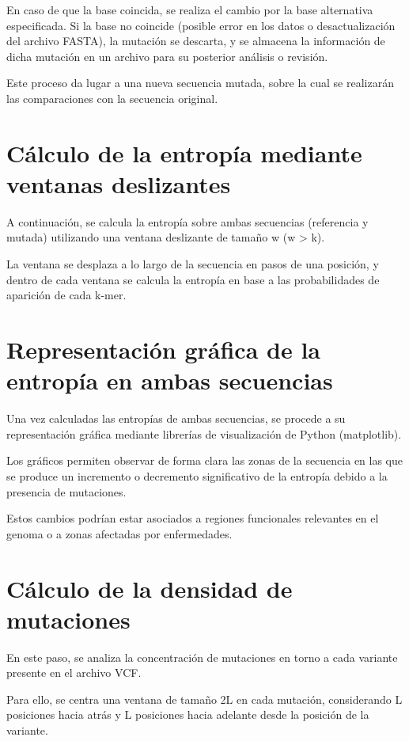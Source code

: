 \documentclass[11pt,spanish,listoffigures,listoftables]{tfgetsinf}
\begin{document}
En caso de que la base coincida, se realiza el cambio por la base alternativa especificada. Si la base no coincide (posible error en los datos o desactualización del archivo FASTA), la mutación se descarta, y se almacena la información de dicha mutación en un archivo para su posterior análisis o revisión.

Este proceso da lugar a una nueva secuencia mutada, sobre la cual se realizarán las comparaciones con la secuencia original.

\section{Cálculo de la entropía mediante ventanas deslizantes}

A continuación, se calcula la entropía sobre ambas secuencias (referencia y mutada) utilizando una ventana deslizante de tamaño w (w > k).

La ventana se desplaza a lo largo de la secuencia en pasos de una posición, y dentro de cada ventana se calcula la entropía en base a las probabilidades de aparición de cada k-mer.

\section{Representación gráfica de la entropía en ambas secuencias}

Una vez calculadas las entropías de ambas secuencias, se procede a su representación gráfica mediante librerías de visualización de Python (matplotlib).

Los gráficos permiten observar de forma clara las zonas de la secuencia en las que se produce un incremento o decremento significativo de la entropía debido a la presencia de mutaciones.

Estos cambios podrían estar asociados a regiones funcionales relevantes en el genoma o a zonas afectadas por enfermedades.

\section{Cálculo de la densidad de mutaciones}

En este paso, se analiza la concentración de mutaciones en torno a cada variante presente en el archivo VCF.

Para ello, se centra una ventana de tamaño 2L en cada mutación, considerando L posiciones hacia atrás y L posiciones hacia adelante desde la posición de la variante.
\end{document}
